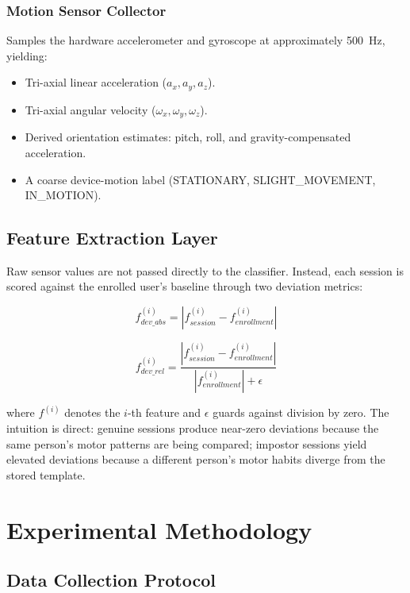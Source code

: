 \documentclass[conference]{IEEEtran}
\begin{document}
\subsubsection{Motion Sensor Collector}
Samples the hardware accelerometer and gyroscope at approximately 500~Hz, yielding:
\begin{itemize}
    \item Tri-axial linear acceleration ($a_x, a_y, a_z$).
    \item Tri-axial angular velocity ($\omega_x, \omega_y, \omega_z$).
    \item Derived orientation estimates: pitch, roll, and gravity-compensated acceleration.
    \item A coarse device-motion label (STATIONARY, SLIGHT\_MOVEMENT, IN\_MOTION).
\end{itemize}

\subsection{Feature Extraction Layer}
Raw sensor values are not passed directly to the classifier. Instead, each session is scored against the enrolled user's baseline through two deviation metrics:

\begin{equation}
    f_{dev\_abs}^{(i)} = |f_{session}^{(i)} - f_{enrollment}^{(i)}|
\end{equation}

\begin{equation}
    f_{dev\_rel}^{(i)} = \frac{|f_{session}^{(i)} - f_{enrollment}^{(i)}|}{|f_{enrollment}^{(i)}| + \epsilon}
\end{equation}

\noindent where $f^{(i)}$ denotes the $i$-th feature and $\epsilon$ guards against division by zero. The intuition is direct: genuine sessions produce near-zero deviations because the same person's motor patterns are being compared; impostor sessions yield elevated deviations because a different person's motor habits diverge from the stored template.

\section{Experimental Methodology}

\subsection{Data Collection Protocol}
\end{document}
